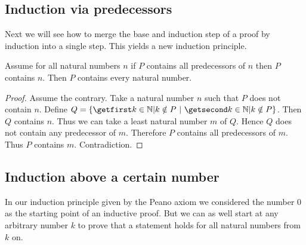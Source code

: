 \documentclass[../../arithmetic.tex]{subfiles}
\begin{document}
  \subsection{Induction via predecessors}

  Next we will see how to merge the base and induction step of a proof by
  induction into a single step. This yields a new induction principle.

  \begin{forthel}
    \begin{theorem}\label{Arithmetic_02_05_167446}
      Assume for all natural numbers $n$ if $P$ contains all predecessors of $n$ then $P$ contains $n$.
      Then $P$ contains every natural number.
    \end{theorem}
    \begin{proof}
      Assume the contrary.
      Take a natural number $n$ such that $P$ does not contain $n$.
      Define $Q = \class{k \in \Nat | k \notin P}$.
      Then $Q$ contains $n$.
      Thus we can take a least natural number $m$ of $Q$.
      Hence $Q$ does not contain any predecessor of $m$.
      Therefore $P$ contains all predecessors of $m$.
      Thus $P$ contains $m$.
      Contradiction.
    \end{proof}
  \end{forthel}


  \subsection{Induction above a certain number}

  In our induction principle given by the  Peano axiom we considered the
  number $0$ as the starting point of an inductive proof. But we can as well
  start at any arbitrary number $k$ to prove that a statement holds for all
  natural numbers from $k$ on.
\end{document}
